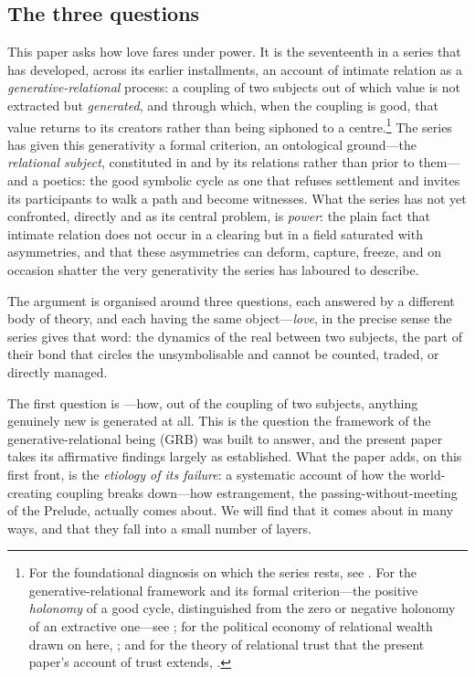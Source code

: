 \goldrule

\subsection{The three questions}
\label{p17:sub:intro-three}

This paper asks how love fares under power. It is the seventeenth in a series that has developed, across its earlier installments, an account of intimate relation as a \emph{generative-relational} process: a coupling of two subjects out of which value is not extracted but \emph{generated}, and through which, when the coupling is good, that value returns to its creators rather than being siphoned to a centre.\footnote{For the foundational diagnosis on which the series rests, see \textcite{wan2024grb}. For the generative-relational framework and its formal criterion---the positive \emph{holonomy} of a good cycle, distinguished from the zero or negative holonomy of an extractive one---see  \parencite{paperix}; for the political economy of relational wealth drawn on here, ; and for the theory of relational trust that the present paper's account of trust extends,  \parencite{paperxiii}.} The series has given this generativity a formal criterion, an ontological ground---the \emph{relational subject}, constituted in and by its relations rather than prior to them---and a poetics: the good symbolic cycle as one that refuses settlement and invites its participants to walk a path and become witnesses. What the series has not yet confronted, directly and as its central problem, is \emph{power}: the plain fact that intimate relation does not occur in a clearing but in a field saturated with asymmetries, and that these asymmetries can deform, capture, freeze, and on occasion shatter the very generativity the series has laboured to describe.

The argument is organised around three questions, each answered by a different body of theory, and each having the same object---\emph{love}, in the precise sense the series gives that word: the dynamics of the real between two subjects, the part of their bond that circles the unsymbolisable and cannot be counted, traded, or directly managed.

The first question is ---how, out of the coupling of two subjects, anything genuinely new is generated at all. This is the question the framework of the generative-relational being (GRB) was built to answer, and the present paper takes its affirmative findings largely as established. What the paper adds, on this first front, is the \emph{etiology of its failure}: a systematic account of how the world-creating coupling breaks down---how estrangement, the passing-without-meeting of the Prelude, actually comes about. We will find that it comes about in many ways, and that they fall into a small number of layers.

